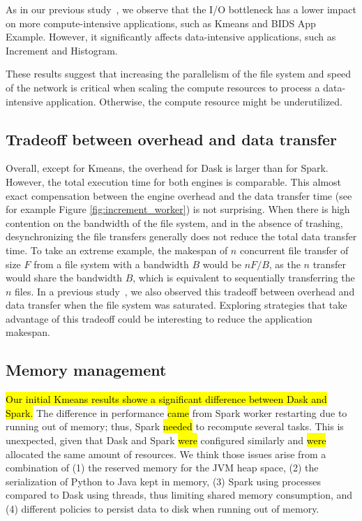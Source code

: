 \documentclass[AMA,STIX1COL]{WileyNJD-v2}
\newcommand{\HL}[1]{\hl{#1}}
\begin{document}
As in our previous study~{\cite{8943502}}, we observe that the I/O bottleneck has a lower impact on more compute-intensive applications, such as Kmeans and BIDS App Example.
However, it significantly affects data-intensive applications, such as Increment and Histogram.
							
							
These results suggest that increasing the parallelism of the file system and speed of the network is critical when scaling the compute resources to process a data-intensive application.
Otherwise, the compute resource might be underutilized.
							
\subsection{Tradeoff between overhead and data transfer}
\label{subsec:overhead-tradeoff}
Overall, except for Kmeans, the overhead for Dask is larger than for Spark.
However, the total execution time for both engines is comparable.
This almost exact compensation between the engine overhead and the data transfer time (see for example Figure \ref{fig:increment_worker}) is not surprising.
When there is high contention on the bandwidth of the file system, and in the absence of trashing, desynchronizing the file transfers generally does not reduce the total data transfer time.
To take an extreme example, the makespan of $n$ concurrent file transfer of size $F$ from a file system with a bandwidth $B$ would be $nF/B$,
as the $n$ transfer would share the bandwidth $B$, which is equivalent to sequentially transferring the $n$ files.
In a previous study~\cite{8943502}, we also observed this tradeoff between overhead and data transfer when the file system was saturated.
Exploring strategies that take advantage of this tradeoff could be interesting to reduce the application makespan.
																	
\subsection{Memory management}
\HL{Our initial Kmeans results showe a significant difference between Dask and Spark.}
The difference in performance \HL{came} from Spark worker restarting due to running out of memory; thus, Spark \HL{needed} to recompute several tasks.
This is unexpected, given that Dask and Spark \HL{were} configured similarly and \HL{were} allocated the same amount of resources.
We think those issues arise from a combination of
(1) the reserved memory for the JVM heap space,
(2) the serialization of Python to Java kept in memory,
(3) Spark using processes compared to Dask using threads, thus limiting shared memory consumption,
and (4) different policies to persist data to disk when running out of memory.
							
\end{document}
